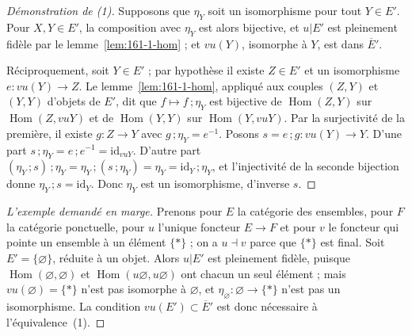 \begin{proof}[Démonstration de (1)]
Supposons que $\eta_Y$ soit un isomorphisme pour tout $Y \in E'$. Pour $X, Y \in E'$, la composition avec $\eta_Y$ est alors bijective, et $u|E'$ est pleinement fidèle par le lemme~\ref{lem:161-1-hom} ; et $vu(Y)$, isomorphe à $Y$, est dans $\overline{E}'$.

Réciproquement, soit $Y \in E'$ ; par hypothèse il existe $Z \in E'$ et un isomorphisme $e : vu(Y) \to Z$. Le lemme~\ref{lem:161-1-hom}, appliqué aux couples $(Z, Y)$ et $(Y, Y)$ d'objets de $E'$, dit que $f \mapsto f\,;\eta_Y$ est bijective de $\operatorname{Hom}(Z, Y)$ sur $\operatorname{Hom}(Z, vuY)$ et de $\operatorname{Hom}(Y, Y)$ sur $\operatorname{Hom}(Y, vuY)$. Par la surjectivité de la première, il existe $g : Z \to Y$ avec $g\,;\eta_Y = e^{-1}$. Posons $s = e\,;g : vu(Y) \to Y$. D'une part $s\,;\eta_Y = e\,;e^{-1} = \mathrm{id}_{vuY}$. D'autre part $(\eta_Y\,;s)\,;\eta_Y = \eta_Y\,;(s\,;\eta_Y) = \eta_Y = \mathrm{id}_Y\,;\eta_Y$, et l'injectivité de la seconde bijection donne $\eta_Y\,;s = \mathrm{id}_Y$. Donc $\eta_Y$ est un isomorphisme, d'inverse $s$.
\end{proof}

\begin{proof}[L'exemple demandé en marge]
Prenons pour $E$ la catégorie des ensembles, pour $F$ la catégorie ponctuelle, pour $u$ l'unique foncteur $E \to F$ et pour $v$ le foncteur qui pointe un ensemble à un élément $\{*\}$ ; on a $u \dashv v$ parce que $\{*\}$ est final. Soit $E' = \{\varnothing\}$, réduite à un objet. Alors $u|E'$ est pleinement fidèle, puisque $\operatorname{Hom}(\varnothing, \varnothing)$ et $\operatorname{Hom}(u\varnothing, u\varnothing)$ ont chacun un seul élément ; mais $vu(\varnothing) = \{*\}$ n'est pas isomorphe à $\varnothing$, et $\eta_\varnothing : \varnothing \to \{*\}$ n'est pas un isomorphisme. La condition $vu(E') \subset \overline{E}'$ est donc nécessaire à l'équivalence~(1).
\end{proof}

